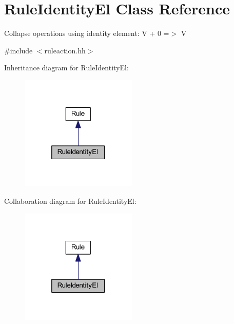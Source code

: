 \hypertarget{class_rule_identity_el}{}\section{Rule\+Identity\+El Class Reference}
\label{class_rule_identity_el}


Collapse operations using identity element\+: {\ttfamily V + 0 =$>$ V}  




{\ttfamily \#include $<$ruleaction.\+hh$>$}



Inheritance diagram for Rule\+Identity\+El\+:
\nopagebreak
\begin{figure}[H]
\begin{center}
\leavevmode
\includegraphics[width=157pt]{class_rule_identity_el__inherit__graph}
\end{center}
\end{figure}


Collaboration diagram for Rule\+Identity\+El\+:
\nopagebreak
\begin{figure}[H]
\begin{center}
\leavevmode
\includegraphics[width=157pt]{class_rule_identity_el__coll__graph}
\end{center}
\end{figure}
